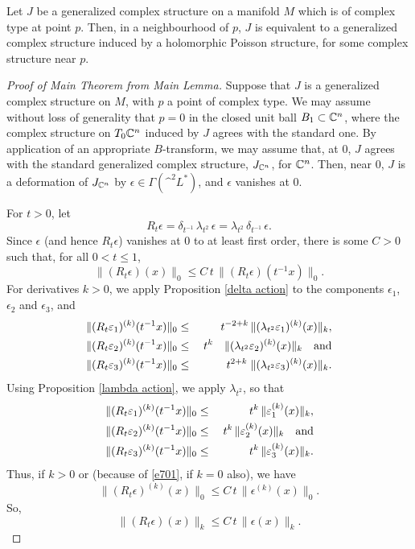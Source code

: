 \documentclass{article}
\begin{document}
\begin{main thm}
Let $J$ be a generalized complex structure on a manifold $M$ which is of complex type at point $p$.  Then, in a neighbourhood of $p$, $J$ is equivalent to a generalized complex structure induced by a holomorphic Poisson structure, for some complex structure near $p$.
\end{main thm}

\begin{proof}[Proof of Main Theorem from Main Lemma]
Suppose that $J$ is a generalized complex structure on $M$, with $p$ a point of complex type.  We may assume without loss of generality that $p=0$ in the closed unit ball $B_1 \subset \C^n$, where the complex structure on $T_0 \C^n$ induced by $J$ agrees with the standard one.  By application of an appropriate $B$-transform, we may assume that, at $0$, $J$ agrees with the standard generalized complex structure, $J_{\C^n}$, for $\C^n$.  Then, near $0$, $J$ is a deformation of $J_{\C^n}$ by $\epsilon \in \Gamma(\^ ^2 L^*)$, and $\epsilon$ vanishes at $0$.

For $t>0$, let
$$R_t \epsilon = \delta_{t^{-1}}\, \lambda_{t^2}\, \epsilon = \lambda_{t^2}\, \delta_{t^{-1}}\, \epsilon.$$
Since $\epsilon$ (and hence $R_t \epsilon$) vanishes at $0$ to at least first order, there is some $C>0$ such that, for all $0 < t \leq 1$,
\begin{equation}\label{e701}
\|(R_t \epsilon) (x)\|_0 \leq C\,t\, \|(R_t \epsilon)(t^{-1}x)\|_0.
\end{equation}
For derivatives $k>0$, we apply Proposition \ref{delta action} to the components $\epsilon_1$, $\epsilon_2$ and $\epsilon_3$, and
\begin{eqnarray*}
\|(R_t \epsilon_1)^{(k)}(t^{-1}x)\|_0 &\leq& t^{-2+k}\, \|(\lambda_{t^2}\epsilon_1)^{(k)}(x)\|_k, \\
\|(R_t \epsilon_2)^{(k)}(t^{-1}x)\|_0 &\leq& \; t^k\quad \|(\lambda_{t^2}\epsilon_2)^{(k)}(x)\|_k \quad\textnormal{and} \\
\|(R_t \epsilon_3)^{(k)}(t^{-1}x)\|_0 &\leq& t^{2+k}\; \|(\lambda_{t^2}\epsilon_3)^{(k)}(x)\|_k.
\end{eqnarray*}
Using Proposition \ref{lambda action}, we apply $\lambda_{t^2}$, so that
\begin{eqnarray*}
\|(R_t \epsilon_1)^{(k)}(t^{-1}x)\|_0 &\leq& t^k\, \|\epsilon_1^{(k)}(x)\|_k, \\
\|(R_t \epsilon_2)^{(k)}(t^{-1}x)\|_0 &\leq& \; t^k\, \|\epsilon_2^{(k)}(x)\|_k \quad\textnormal{and} \\
\|(R_t \epsilon_3)^{(k)}(t^{-1}x)\|_0 &\leq& t^k\, \|\epsilon_3^{(k)}(x)\|_k.
\end{eqnarray*}
Thus, if $k>0$ or (because of \eqref{e701}, if $k=0$ also), we have
$$\|(R_t \epsilon)^{(k)} (x)\|_0 \leq C\,t\, \|\epsilon^{(k)}(x)\|_0.$$
So,
$$\|(R_t \epsilon) (x)\|_k \leq C\,t\, \|\epsilon(x)\|_k.$$


\end{proof}
\end{document}
